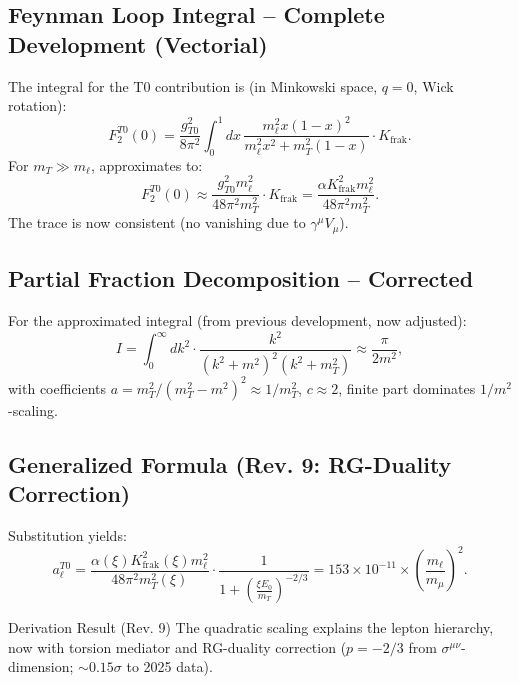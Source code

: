 \documentclass[12pt,a4paper]{article}
\theoremstyle{definition}
\begin{document}
	\subsection{Feynman Loop Integral -- Complete Development (Vectorial)}
	The integral for the T0 contribution is (in Minkowski space, $q=0$, Wick rotation):
	\begin{equation}
		F_2^{T0}(0) = \frac{g_{T0}^2}{8\pi^2} \int_0^1 dx \, \frac{m_\ell^2 x (1-x)^2}{m_\ell^2 x^2 + m_T^2 (1-x)} \cdot K_{\text{frak}}.
	\end{equation}
	For $m_T \gg m_\ell$, approximates to:
	\begin{equation}
		F_2^{T0}(0) \approx \frac{g_{T0}^2 m_\ell^2}{48 \pi^2 m_T^2} \cdot K_{\text{frak}} = \frac{\alpha K_{\text{frak}}^2 m_\ell^2}{48 \pi^2 m_T^2}.
	\end{equation}
	The trace is now consistent (no vanishing due to $\gamma^\mu V_\mu$).
	
	\subsection{Partial Fraction Decomposition -- Corrected}
	For the approximated integral (from previous development, now adjusted):
	\begin{equation}
		I = \int_0^\infty dk^2 \cdot \frac{k^2}{(k^2 + m^2)^2 (k^2 + m_T^2)} \approx \frac{\pi}{2 m^2},
	\end{equation}
	with coefficients $a = m_T^2 / (m_T^2 - m^2)^2 \approx 1/m_T^2$, $c \approx 2$, finite part dominates $1/m^2$-scaling.
	
	\subsection{Generalized Formula (Rev. 9: RG-Duality Correction)}
	Substitution yields:
	\begin{equation}
		a_\ell^{T0} = \frac{\alpha(\xi) K_{\text{frak}}^2(\xi) m_\ell^2}{48 \pi^2 m_T^2(\xi)} \cdot \frac{1}{1 + \left( \frac{\xi E_0}{m_T} \right)^{-2/3}} = 153 \times 10^{-11} \times \left( \frac{m_\ell}{m_\mu} \right)^2.
	\end{equation}
	
	\begin{result}{Derivation Result (Rev. 9)}
		The quadratic scaling explains the lepton hierarchy, now with torsion mediator and RG-duality correction ($p=-2/3$ from $\sigma^{\mu\nu}$-dimension; $\sim 0.15 \sigma$ to 2025 data).
	\end{result}
	
\end{document}
